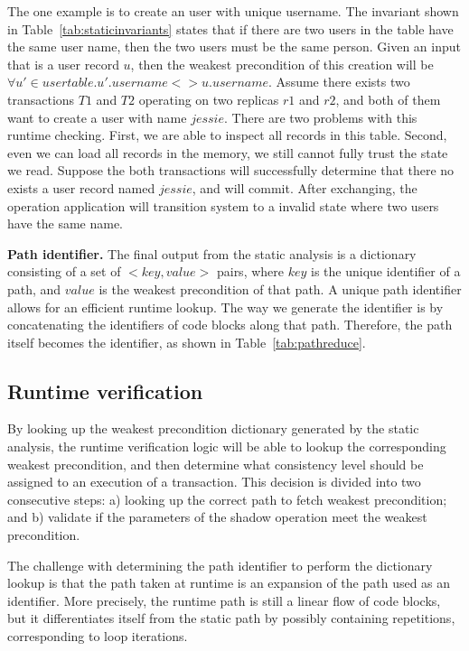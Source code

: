 The one example is to create an user with unique username. The invariant shown in Table~\ref{tab:staticinvariants}
states that if there are two users in the table have the same user name, then the two users
must be the same person. Given an input that is a user record $u$, then the weakest precondition
of this creation will be $\forall u' \in usertable. u'.username <> u.username$. Assume there exists
two transactions $T1$ and $T2$ operating on two replicas $r1$ and $r2$, and both of them want to
create a user with name $jessie$. There are two problems with this runtime checking. First, we
are able to inspect all records in this table. Second, even we can load all records in the memory, 
we still cannot fully trust the state we read. Suppose the both transactions will successfully 
determine that there no exists a user record named $jessie$, and will commit. After exchanging,
the operation application will transition system to a invalid state where two users have the same name.

{\bf Path identifier.}
The final output from the static analysis is a dictionary consisting of 
a set of $<key, value>$ pairs, where $key$ is the unique identifier of a path,
and $value$ is the weakest precondition of that path. A unique
path identifier allows for an efficient runtime lookup. The way we generate the
identifier is by concatenating the identifiers of code blocks along that path. Therefore,
the path itself becomes the identifier, as shown in Table~\ref{tab:pathreduce}.

\subsection{Runtime verification}
\label{sect:runtimeverification}

By looking up the weakest precondition dictionary generated by the static analysis,
the runtime verification logic will be able to lookup the corresponding
weakest precondition, and then determine what consistency level should be assigned
to an execution of a transaction. This decision is divided into two consecutive
steps: a) looking up the correct path to fetch weakest precondition; and b)
validate if the parameters of the shadow operation meet the weakest precondition.

The challenge with determining the path identifier to perform the dictionary lookup
is that the path taken at runtime is an expansion of the path used as an
identifier. More precisely, the runtime path is still a linear flow of code blocks, but it differentiates itself from
the static path by possibly containing repetitions, corresponding to loop iterations.  

